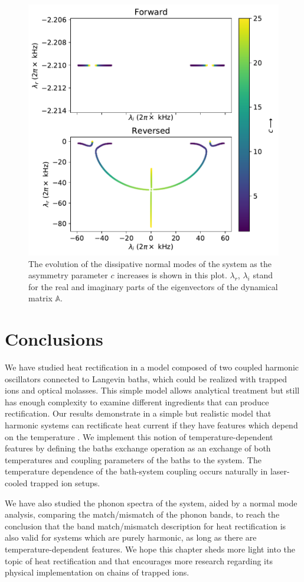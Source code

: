\begin{figure}
  \center
  \includegraphics[width=0.75\linewidth]{Figures/Eigenvals_NormalModes.pdf}
  \caption{The evolution of the dissipative normal modes of the system as the asymmetry parameter $c$ increases is shown in this plot. $\lambda_r$, $\lambda_i$ stand for the real and imaginary parts of the eigenvectors of the dynamical matrix $\mathbb{A}$.}
  \label{fig:Figure_Eigenvals_NormalModes}
\end{figure}


%
\section{Conclusions \label{sec:Conclusions}}
%
We have studied heat rectification in a model composed of two coupled harmonic oscillators connected to Langevin baths, which could be realized with trapped ions and optical molasses. This simple model allows analytical treatment but still has enough complexity to examine different ingredients that can produce rectification. %
Our results demonstrate in a simple but realistic model that harmonic systems can rectificate heat current if they have features which depend on the temperature  \cite{Pereira2017}. We implement this notion of temperature-dependent features by defining the baths exchange operation as an exchange of both temperatures and coupling parameters of the baths to the system. The temperature dependence of the bath-system coupling  occurs naturally in laser-cooled trapped ion setups.

We have also studied the phonon spectra of the system, aided by a normal mode analysis,
comparing the match/mismatch of the phonon bands, to reach the conclusion that the band match/mismatch description for heat rectification is also valid for systems which are purely harmonic, as long as there are temperature-dependent features.
We hope this chapter sheds more light into the topic of heat rectification and that encourages more research regarding its physical implementation on chains of trapped ions.
